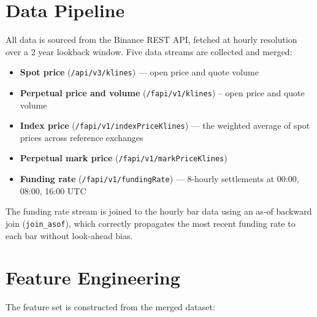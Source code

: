 \documentclass[11pt,a4paper]{article}
\begin{document}
\section{Data Pipeline}

All data is sourced from the Binance REST API, fetched at hourly resolution
over a 2 year lookback window. Five data streams are collected and merged:

\begin{itemize}[leftmargin=1.5em, itemsep=2pt]
    \item \textbf{Spot price} (\texttt{/api/v3/klines}) --- open price
          and quote volume
    \item \textbf{Perpetual price and volume} (\texttt{/fapi/v1/klines}) -- open price and quote volume
    \item \textbf{Index price} (\texttt{/fapi/v1/indexPriceKlines}) --- the
          weighted average of spot prices across reference exchanges
    \item \textbf{Perpetual mark price} (\texttt{/fapi/v1/markPriceKlines})
    \item \textbf{Funding rate} (\texttt{/fapi/v1/fundingRate}) --- 8-hourly
          settlements at 00:00, 08:00, 16:00 UTC
\end{itemize}

The funding rate stream is joined to the hourly bar data using an
as-of backward join (\texttt{join\_asof}), which correctly propagates
the most recent funding rate to each bar without look-ahead bias.

\section{Feature Engineering}

The feature set is constructed from the merged dataset:
\end{document}
